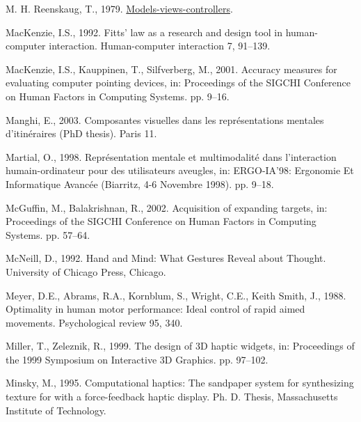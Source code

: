 \documentclass[
]{book}
\newlength{\cslhangindent}
\newlength{\cslentryspacingunit} %
\newenvironment{CSLReferences}[2] %
 {%
  \setlength{\parindent}{0pt}
  \ifodd #1
  \let\oldpar\par
  \def\par{\hangindent=\cslhangindent\oldpar}
  \fi
  \setlength{\parskip}{#2\cslentryspacingunit}
 }%
 {}
\begin{document}
\begin{CSLReferences}{1}{0}
\leavevmode{}%
M. H. Reenskaug, T., 1979. \href{http://heim.ifi.uio.no/~trygver/1979/mvc-2/1979-12-MVC.pdf}{Models-views-controllers}.

\leavevmode{}%
MacKenzie, I.S., 1992. Fitts' law as a research and design tool in human-computer interaction. Human-computer interaction 7, 91--139.

\leavevmode{}%
MacKenzie, I.S., Kauppinen, T., Silfverberg, M., 2001. Accuracy measures for evaluating computer pointing devices, in: Proceedings of the SIGCHI Conference on Human Factors in Computing Systems. pp. 9--16.

\leavevmode{}%
Manghi, E., 2003. Composantes visuelles dans les repr{é}sentations mentales d'itin{é}raires (PhD thesis). Paris 11.

\leavevmode{}%
Martial, O., 1998. Repr{é}sentation mentale et multimodalit{é} dans l'interaction humain-ordinateur pour des utilisateurs aveugles, in: ERGO-IA'98: Ergonomie Et Informatique Avanc{é}e (Biarritz, 4-6 Novembre 1998). pp. 9--18.

\leavevmode{}%
McGuffin, M., Balakrishnan, R., 2002. Acquisition of expanding targets, in: Proceedings of the SIGCHI Conference on Human Factors in Computing Systems. pp. 57--64.

\leavevmode{}%
McNeill, D., 1992. Hand and {Mind}: What {Gestures} {Reveal} about {Thought}. University of Chicago Press, Chicago.

\leavevmode{}%
Meyer, D.E., Abrams, R.A., Kornblum, S., Wright, C.E., Keith Smith, J., 1988. Optimality in human motor performance: Ideal control of rapid aimed movements. Psychological review 95, 340.

\leavevmode{}%
Miller, T., Zeleznik, R., 1999. The design of 3D haptic widgets, in: Proceedings of the 1999 Symposium on Interactive 3D Graphics. pp. 97--102.

\leavevmode{}%
Minsky, M., 1995. Computational haptics: The sandpaper system for synthesizing texture for with a force-feedback haptic display. Ph. D. Thesis, Massachusetts Institute of Technology.


\end{CSLReferences}
\end{document}
